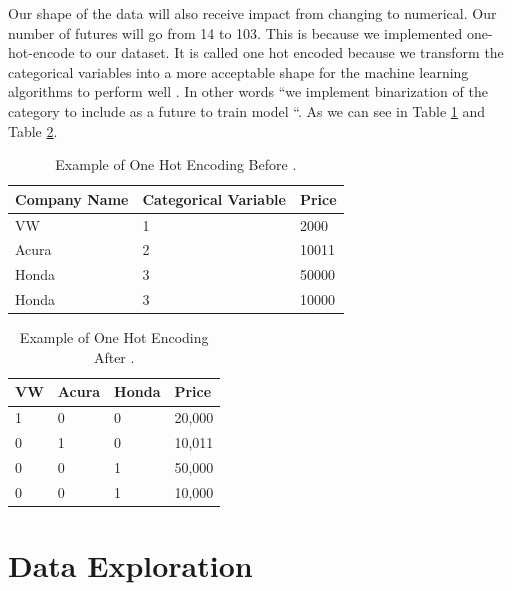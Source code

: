 \documentclass[sigconf]{acmart}
\begin{document}
\par Our shape of the data will also receive impact from changing to numerical. Our number of futures will go from 14 to 103. This is because we implemented one-hot-encode to our dataset. It is called one hot encoded because we transform the categorical variables into a more acceptable shape for the machine learning algorithms to perform well \cite{www-hackernoon}. In other words ``we implement binarization of the category to include as a future to train model \cite{www-hackernoon}``. As we can see in Table \ref{one-hot-before} and Table \ref{one-hot-after}.


\begin{table}[!ht]
\centering
\begin{tabular}{|l|l|l|}
\hline
\textbf{Company Name} & \textbf{Categorical Variable} & \textbf{Price} \\ \hline
VW                    & 1                             & 2000           \\ \hline
Acura                 & 2                             & 10011          \\ \hline
Honda                 & 3                             & 50000          \\ \hline
Honda                 & 3                             & 10000          \\ \hline
\end{tabular}
\caption{Example of One Hot Encoding Before \cite{www-hackernoon}.}
\label{one-hot-before}
\end{table}


\begin{table}[!ht]
\centering
\begin{tabular}{|l|l|l|l|}
\hline
VW & Acura & Honda & Price  \\ \hline
1  & 0     & 0     & 20,000 \\ \hline
0  & 1     & 0     & 10,011 \\ \hline
0  & 0     & 1     & 50,000 \\ \hline
0  & 0     & 1     & 10,000 \\ \hline
\end{tabular}
\caption{Example of One Hot Encoding After \cite{www-hackernoon}.}
\label{one-hot-after}
\end{table}


\section{Data Exploration}
\end{document}
